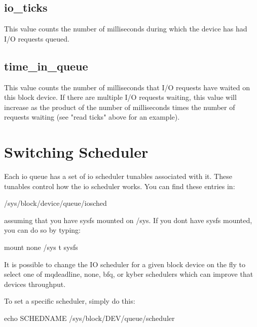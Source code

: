 \documentclass[a4paper,11pt,english]{sphinxmanual}
\begin{document}
\section{io\_ticks}
\label{\detokenize{stat:io-ticks}}
This value counts the number of milliseconds during which the device has
had I/O requests queued.


\section{time\_in\_queue}
\label{\detokenize{stat:time-in-queue}}
This value counts the number of milliseconds that I/O requests have waited
on this block device.  If there are multiple I/O requests waiting, this
value will increase as the product of the number of milliseconds times the
number of requests waiting (see "read ticks" above for an example).


\chapter{Switching Scheduler}
\label{\detokenize{switching-sched:switching-scheduler}}\label{\detokenize{switching-sched::doc}}
Each io queue has a set of io scheduler tunables associated with it. These
tunables control how the io scheduler works. You can find these entries
in:

\begin{sphinxVerbatim}[commandchars=\\\{\}]
/sys/block/\PYGZlt{}device\PYGZgt{}/queue/iosched
\end{sphinxVerbatim}

assuming that you have sysfs mounted on /sys. If you don\textquotesingle{}t have sysfs mounted,
you can do so by typing:

\begin{sphinxVerbatim}[commandchars=\\\{\}]
\PYGZsh{} mount none /sys \PYGZhy{}t sysfs
\end{sphinxVerbatim}

It is possible to change the IO scheduler for a given block device on
the fly to select one of mq\sphinxhyphen{}deadline, none, bfq, or kyber schedulers \sphinxhyphen{}
which can improve that device\textquotesingle{}s throughput.

To set a specific scheduler, simply do this:

\begin{sphinxVerbatim}[commandchars=\\\{\}]
echo SCHEDNAME \PYGZgt{} /sys/block/DEV/queue/scheduler
\end{sphinxVerbatim}
\end{document}
